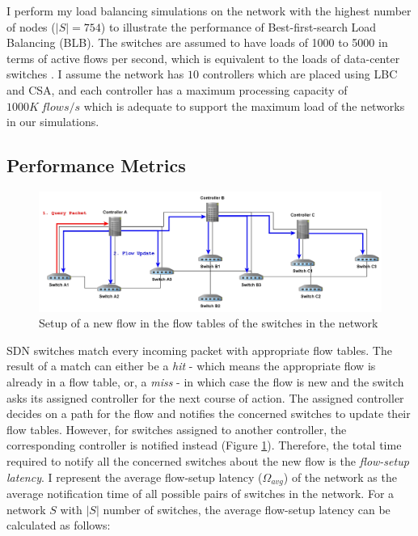 \documentclass[journal]{IEEEtran}
\begin{document}
I perform my load balancing simulations on the network with the highest number of nodes ($|S|=754$) to illustrate the performance of Best-first-search Load Balancing (BLB). The switches are assumed to have loads of 1000 to 5000 in terms of active flows per second, which is equivalent to the loads of data-center switches \cite{benson2010network}. I assume the network has $10$ controllers which are placed using LBC and CSA, and each controller has a maximum processing capacity of $1000K~flows/s$ which is adequate to support the maximum load of the networks in our simulations.
\subsection{Performance Metrics}

\begin{figure}
	\centering
	\includegraphics[width=\linewidth]{Images/new_flow.jpg}
	\caption{Setup of a new flow in the flow tables of the switches in the network} \label{new_flow}
\end{figure}

SDN switches match every incoming packet with appropriate flow tables. The result of a match can either be a \textit{hit} - which means the appropriate flow is already in a flow table, or, a \textit{miss} - in which case the flow is new and the switch asks its assigned controller for the next course of action. The assigned controller decides on a path for the flow and notifies the concerned switches to update their flow tables. However, for switches assigned to another controller, the corresponding controller is notified instead (Figure \ref{new_flow}). Therefore, the total time required to notify all the concerned switches about the new flow is the \textit{flow-setup latency}. I represent the average flow-setup latency ($\Omega_{avg}$) of the network as the average notification time of all possible pairs of switches in the network. For a network $S$ with $|S|$ number of switches, the average flow-setup latency can be calculated as follows:
\end{document}
